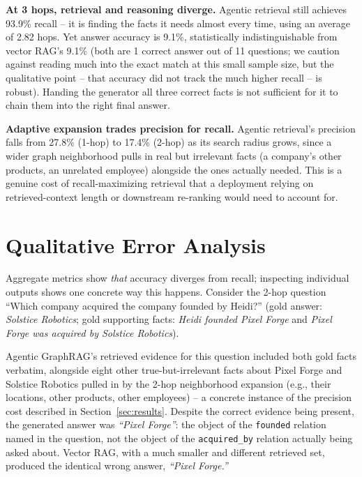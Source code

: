 \documentclass[11pt]{article}
\begin{document}
\textbf{At 3 hops, retrieval and reasoning diverge.} Agentic retrieval still achieves 93.9\% recall -- it is finding the facts it needs almost every time, using an average of 2.82 hops. Yet answer accuracy is 9.1\%, statistically indistinguishable from vector RAG's 9.1\% (both are 1 correct answer out of 11 questions; we caution against reading much into the exact match at this small sample size, but the qualitative point -- that accuracy did not track the much higher recall -- is robust). Handing the generator all three correct facts is not sufficient for it to chain them into the right final answer.

\textbf{Adaptive expansion trades precision for recall.} Agentic retrieval's precision falls from 27.8\% (1-hop) to 17.4\% (2-hop) as its search radius grows, since a wider graph neighborhood pulls in real but irrelevant facts (a company's other products, an unrelated employee) alongside the ones actually needed. This is a genuine cost of recall-maximizing retrieval that a deployment relying on retrieved-context length or downstream re-ranking would need to account for.

\section{Qualitative Error Analysis}
\label{sec:qualitative}

Aggregate metrics show \emph{that} accuracy diverges from recall; inspecting individual outputs shows one concrete way this happens. Consider the 2-hop question ``Which company acquired the company founded by Heidi?'' (gold answer: \emph{Solstice Robotics}; gold supporting facts: \emph{Heidi founded Pixel Forge} and \emph{Pixel Forge was acquired by Solstice Robotics}).

Agentic GraphRAG's retrieved evidence for this question included both gold facts verbatim, alongside eight other true-but-irrelevant facts about Pixel Forge and Solstice Robotics pulled in by the 2-hop neighborhood expansion (e.g., their locations, other products, other employees) -- a concrete instance of the precision cost described in Section~\ref{sec:results}. Despite the correct evidence being present, the generated answer was \emph{``Pixel Forge''}: the object of the \texttt{founded} relation named in the question, not the object of the \texttt{acquired\_by} relation actually being asked about. Vector RAG, with a much smaller and different retrieved set, produced the identical wrong answer, \emph{``Pixel Forge.''}
\end{document}

